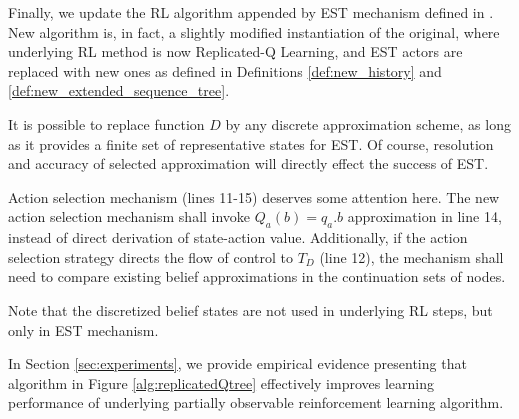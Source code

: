 \documentclass[10pt, conference, compsocconf]{IEEEtran}
\begin{document}
Finally, we update the RL algorithm appended by EST mechanism defined in \cite{girgin_improving_2010}. New algorithm is, in fact, a slightly modified instantiation of the original, where underlying RL method is now Replicated-Q Learning, and EST actors are replaced with new ones as defined in Definitions \ref{def:new_history} and \ref{def:new_extended_sequence_tree}.

It is possible to replace function $D$ by any discrete approximation scheme, as long as it provides a finite set of representative states for EST. Of course, resolution and accuracy of selected approximation will directly effect the success of EST.

Action selection mechanism (lines 11-15) deserves some attention here. The new action selection mechanism shall invoke $Q_a(b)=q_{a}.b$ approximation in line 14, instead of direct derivation of state-action value. Additionally, if the action selection strategy directs the flow of control to $T_D$ (line 12), the mechanism shall need to compare existing belief approximations in the continuation sets of nodes.

Note that the discretized belief states are not used in underlying RL steps, but only in EST mechanism.

In Section \ref{sec:experiments}, we provide empirical evidence presenting that algorithm in Figure \ref{alg:replicatedQtree} effectively improves learning performance of underlying partially observable reinforcement learning algorithm.
\end{document}
